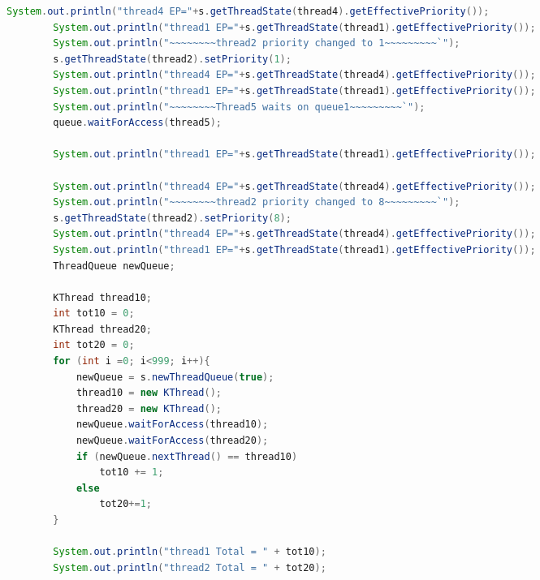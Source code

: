 \documentclass{article}
\begin{document}
\begin{spacing}{1.1}
\begin{lstlisting}[language=Java]
		System.out.println("thread4 EP="+s.getThreadState(thread4).getEffectivePriority());
		System.out.println("thread1 EP="+s.getThreadState(thread1).getEffectivePriority());
		System.out.println("~~~~~~~~thread2 priority changed to 1~~~~~~~~~`");
		s.getThreadState(thread2).setPriority(1);
		System.out.println("thread4 EP="+s.getThreadState(thread4).getEffectivePriority());
		System.out.println("thread1 EP="+s.getThreadState(thread1).getEffectivePriority());
		System.out.println("~~~~~~~~Thread5 waits on queue1~~~~~~~~~`");
		queue.waitForAccess(thread5);

		System.out.println("thread1 EP="+s.getThreadState(thread1).getEffectivePriority());

		System.out.println("thread4 EP="+s.getThreadState(thread4).getEffectivePriority());
		System.out.println("~~~~~~~~thread2 priority changed to 8~~~~~~~~~`");
		s.getThreadState(thread2).setPriority(8);
		System.out.println("thread4 EP="+s.getThreadState(thread4).getEffectivePriority());
		System.out.println("thread1 EP="+s.getThreadState(thread1).getEffectivePriority());
		ThreadQueue newQueue;

		KThread thread10;
		int tot10 = 0;
		KThread thread20;
		int tot20 = 0;
		for (int i =0; i<999; i++){
			newQueue = s.newThreadQueue(true);
			thread10 = new KThread();
			thread20 = new KThread();
			newQueue.waitForAccess(thread10);
			newQueue.waitForAccess(thread20);
			if (newQueue.nextThread() == thread10)
				tot10 += 1;
			else
				tot20+=1;	
		}

		System.out.println("thread1 Total = " + tot10);
		System.out.println("thread2 Total = " + tot20);

\end{lstlisting}



\end{spacing}
\end{document}
